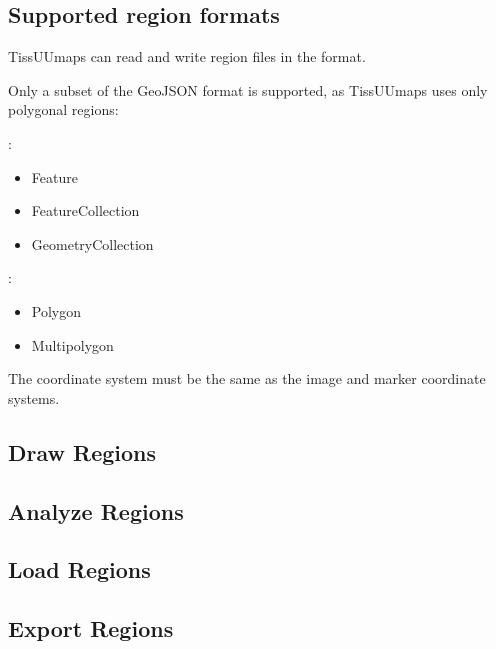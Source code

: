 \documentclass[letterpaper,10pt,english,openany,oneside]{sphinxmanual}
\begin{document}
\subsection{Supported region formats}
\label{\detokenize{docs/starting/regions:supported-region-formats}}
\sphinxAtStartPar
TissUUmaps can read and write region files in the  format.

\sphinxAtStartPar
Only a subset of the GeoJSON format is supported, as TissUUmaps uses only polygonal regions:

\sphinxAtStartPar
{}:
\begin{itemize}
\item {} 
\sphinxAtStartPar
Feature

\item {} 
\sphinxAtStartPar
FeatureCollection

\item {} 
\sphinxAtStartPar
GeometryCollection

\end{itemize}

\sphinxAtStartPar
{}:
\begin{itemize}
\item {} 
\sphinxAtStartPar
Polygon

\item {} 
\sphinxAtStartPar
Multipolygon

\end{itemize}

\sphinxAtStartPar
The coordinate system must be the same as the image and marker coordinate systems.


\subsection{Draw Regions}
\label{\detokenize{docs/starting/regions:draw-regions}}

\subsection{Analyze Regions}
\label{\detokenize{docs/starting/regions:analyze-regions}}

\subsection{Load Regions}
\label{\detokenize{docs/starting/regions:load-regions}}

\subsection{Export Regions}
\label{\detokenize{docs/starting/regions:export-regions}}
\sphinxstepscope
\end{document}
